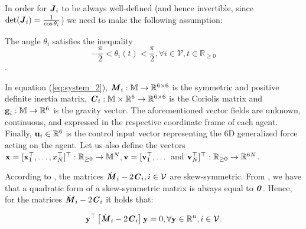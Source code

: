 In order for $\bm{\mathit{J}}_i$ to be always well-defined (and hence invertible, since
$\det(\bm{\mathit{J}}_i) = \frac{1}{\cos\theta_i}$) we need to make the following assumption:

\begin{assumption} \label{as:J}
	The angle $\theta_i$ satisfies the inequality
  $$-\frac{\pi}{2} < \theta_i(t) < \frac{\pi}{2} ,\forall i\in\mathcal{V},t\in\mathbb{R}_{\geq 0}$$.
\end{assumption}

In equation (\ref{eq:system_2}), $\bm{\mathit{M}}_i:\mathbb{M} \to \mathbb{R}^{6\times6}$ is
the symmetric and positive definite inertia matrix,
$\bm{\mathit{C}}_i:\mathbb{M}\times\mathbb{R}^6 \to \mathbb{R}^{6\times6}$ is the Coriolis
matrix and $\bm{\mathbf{g}}_i:\mathbb{M} \to \mathbb{R}^6$ is the gravity vector.
The aforementioned vector fields are unknown, continuous,
and expressed in the respective coordinate frame of each agent.
Finally, $\bm{\mathbf{u}}_i\in\mathbb{R}^6$ is the control input vector representing the $6$D
generalized force acting on the agent. Let us also define the vectors
$\bm{\mathbf{x}} = [\bm{\mathbf{x}}_1^\top, \dots, x_N^\top]^\top :
\mathbb{R}_{\geq 0} \to \mathbb{M}^N, \bm{\mathbf{v}} = [\bm{\mathbf{v}}_1^\top, \dots$
and $\bm{\mathbf{v}}_N^\top]^\top: \mathbb{R}_{\geq 0} \to \mathbb{R}^{6N}$.

\begin{remark}
	According to \cite{Siciliano2009}, the matrices
  $\dot{\bm{\mathit{M}}}_i - 2\bm{\mathit{C}}_i, i \in \mathcal{V}$ are skew-symmetric.
  From \cite{horn_jonshon}, we have that a quadratic form of a skew-symmetric
  matrix is always equal to $\bm{\mathit{0}}$. Hence, for the matrices
  $\dot{\bm{\mathit{M}}}_i - 2 \bm{\mathit{C}}_i$ it holds that:

	\begin{equation} \label{eq:skew_symm}
	  \bm{\mathbf{y}}^\top \left[\dot{\bm{\mathit{M}}}_i - 2 \bm{\mathit{C}}_i\right]\bm{\mathbf{y}} = 0, \forall \bm{\mathbf{y}} \in \mathbb{R}^n, i \in \mathcal{V}.
	\end{equation}

\end{remark}

